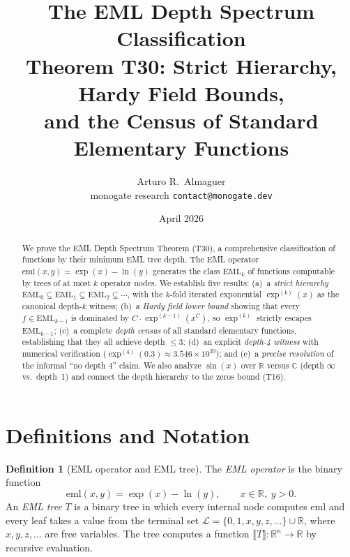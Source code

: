 \documentclass[12pt,a4paper]{article}
\title{The EML Depth Spectrum Classification\\
       \large Theorem T30: Strict Hierarchy, Hardy Field Bounds,\\
       and the Census of Standard Elementary Functions}
\author{Arturo R.\ Almaguer\\
\small monogate research \quad \texttt{contact@monogate.dev}}
\date{April 2026}
\theoremstyle{definition}
\newtheorem{definition}[theorem]{Definition}
\theoremstyle{remark}
\begin{document}
\maketitle
\tableofcontents

\begin{abstract}
We prove the EML Depth Spectrum Theorem (T30), a comprehensive classification
of functions by their minimum EML tree depth.  The EML operator
$\mathrm{eml}(x,y)=\exp(x)-\ln(y)$ generates the class $\mathrm{EML}_k$ of
functions computable by trees of at most $k$ operator nodes.  We establish
five results: (a)~a \emph{strict hierarchy}
$\mathrm{EML}_0\subsetneq\mathrm{EML}_1\subsetneq\mathrm{EML}_2\subsetneq\cdots$,
with the $k$-fold iterated exponential $\exp^{(k)}(x)$ as the canonical
depth-$k$ witness; (b)~a \emph{Hardy field lower bound} showing that every
$f\in\mathrm{EML}_{k-1}$ is dominated by $C\cdot\exp^{(k-1)}(x^C)$, so
$\exp^{(k)}$ strictly escapes $\mathrm{EML}_{k-1}$; (c)~a complete
\emph{depth census} of all standard elementary functions, establishing that
they all achieve depth $\leq 3$; (d)~an explicit \emph{depth-4 witness} with
numerical verification ($\exp^{(4)}(0.3)\approx 3.546\times 10^{20}$); and
(e)~a \emph{precise resolution} of the informal ``no depth 4'' claim.  We also
analyze $\sin(x)$ over $\mathbb{R}$ versus $\mathbb{C}$ (depth $\infty$ vs.\
depth~1) and connect the depth hierarchy to the zeros bound (T16).
\end{abstract}

\section{Definitions and Notation}

\begin{definition}[EML operator and EML tree]\label{def:eml-tree}
The \emph{EML operator} is the binary function
\[
  \mathrm{eml}(x,y) = \exp(x) - \ln(y), \qquad x\in\mathbb{R},\; y>0.
\]
An \emph{EML tree} $T$ is a binary tree in which every internal node computes
$\mathrm{eml}$ and every leaf takes a value from the terminal set
$\mathcal{L}=\{0,1,x,y,z,\ldots\}\cup\mathbb{R}$,
where $x,y,z,\ldots$ are free variables.  The tree computes a function
$\llbracket T\rrbracket:\mathbb{R}^n\to\mathbb{R}$ by recursive evaluation.
\end{definition}
\end{document}
